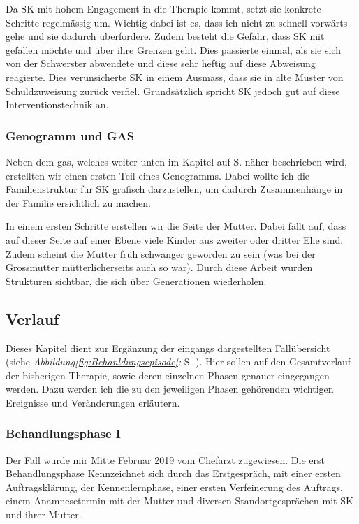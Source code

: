 Da SK mit hohem Engagement in die Therapie kommt, setzt sie konkrete Schritte regelmässig um. Wichtig dabei ist es, dass ich nicht zu schnell vorwärts gehe und sie dadurch überfordere. Zudem besteht die Gefahr, dass SK mit gefallen möchte und über ihre Grenzen geht. Dies passierte einmal, als sie sich von der Schwerster abwendete und diese sehr heftig auf diese Abweisung reagierte. Dies verunsicherte SK in einem Ausmass, dass sie in alte Muster von Schuldzuweisung zurück verfiel. Grundsätzlich spricht SK jedoch gut auf diese Interventionstechnik an.

\subsubsection{Genogramm und GAS}
Neben dem \ac{gas}, welches weiter unten im Kapitel \textit{} auf S. \pageref{sec:Evaluationsverfahren} näher beschrieben wird, erstellten wir einen ersten Teil eines Genogramms. Dabei wollte ich die Familienstruktur für SK grafisch darzustellen, um dadurch Zusammenhänge in der Familie ersichtlich zu machen. 

In einem ersten Schritte erstellen wir die Seite der Mutter. Dabei fällt auf, dass auf dieser Seite auf einer Ebene viele Kinder aus zweiter oder dritter Ehe sind. Zudem scheint die Mutter früh schwanger geworden zu sein (was bei der Grossmutter mütterlicherseits auch so war). Durch diese Arbeit wurden Strukturen sichtbar, die sich über Generationen wiederholen.

\subsection{Verlauf}\label{Verlauf} 
Dieses Kapitel dient zur Ergänzung der eingangs dargestellten Fallübersicht (siehe \textit{Abbildung\ref{fig:Behanldungsepisode}: } S. \pageref{fig:Behanldungsepisode}). Hier sollen auf den Gesamtverlauf der bisherigen Therapie, sowie deren einzelnen Phasen genauer eingegangen werden. Dazu werden ich die zu den jeweiligen Phasen gehörenden wichtigen Ereignisse und Veränderungen erläutern. 
 
\subsubsection{Behandlungsphase I}
Der Fall wurde mir Mitte Februar 2019 vom Chefarzt zugewiesen. Die erst Behandlungsphase Kennzeichnet sich durch das Erstgespräch, mit einer ersten Auftragsklärung, der Kennenlernphase, einer ersten Verfeinerung des Auftrags, einem Anamnesetermin mit der Mutter und diversen Standortgesprächen mit SK und ihrer Mutter. 

